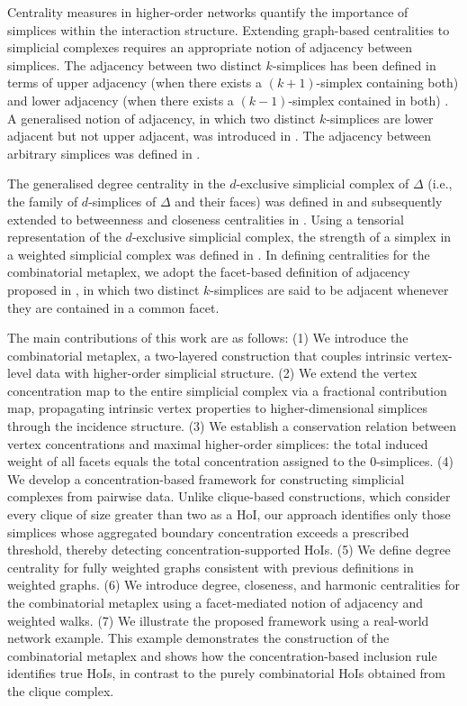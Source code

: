 \documentclass[12pt]{article}
\theoremstyle{normalhead_nobrackets}
\theoremstyle{exampstyle}
\begin{document}
Centrality measures in higher-order networks quantify the importance of simplices within the interaction structure. Extending graph-based centralities to simplicial complexes requires an appropriate notion of adjacency between simplices. The adjacency between two distinct $k$-simplices has been defined in terms of upper adjacency (when there exists a $(k+1)$-simplex containing both) and lower adjacency (when there exists a $(k-1)$-simplex contained in both) \cite{goldberg2002}. A generalised notion of adjacency, in which two distinct $k$-simplices are lower adjacent but not upper adjacent, was introduced in \cite{estrada2018}. The adjacency between arbitrary simplices was defined in \cite{serrano2020, serrano2020simplicial}.

The generalised degree centrality in the $d$-exclusive simplicial complex of $\Delta$ (i.e., the family of $d$-simplices of $\Delta$ and their faces) was defined in \cite{courtney2016generalized} and subsequently extended to betweenness and closeness centralities in \cite{raj2023}. Using a tensorial representation of the $d$-exclusive simplicial complex, the strength of a simplex in a weighted simplicial complex was defined in \cite{courtney2017weighted}. In defining centralities for the combinatorial metaplex, we adopt the facet-based definition of adjacency proposed in \cite{raj2025study}, in which two distinct $k$-simplices are said to be adjacent whenever they are contained in a common facet.

The main contributions of this work are as follows: (1) We introduce the combinatorial metaplex, a two-layered construction that couples intrinsic vertex-level data with higher-order simplicial structure. (2) We extend the vertex concentration map to the entire simplicial complex via a fractional contribution map, propagating intrinsic vertex properties to higher-dimensional simplices through the incidence structure. (3) We establish a conservation relation between vertex concentrations and maximal higher-order simplices: the total induced weight of all facets equals the total concentration assigned to the $0$-simplices. (4) We develop a concentration-based framework for constructing simplicial complexes from pairwise data. Unlike clique-based constructions, which consider every clique of size greater than two as a HoI, our approach identifies only those simplices whose aggregated boundary concentration exceeds a prescribed threshold, thereby detecting concentration-supported HoIs. (5) We define degree centrality for fully weighted graphs consistent with previous definitions in weighted graphs. (6) We introduce degree, closeness, and harmonic centralities for the combinatorial metaplex using a facet-mediated notion of adjacency and weighted walks. (7) We illustrate the proposed framework using a real-world network example. This example demonstrates the construction of the combinatorial metaplex and shows how the concentration-based inclusion rule identifies true HoIs, in contrast to the purely combinatorial HoIs obtained from the clique complex.
\end{document}
